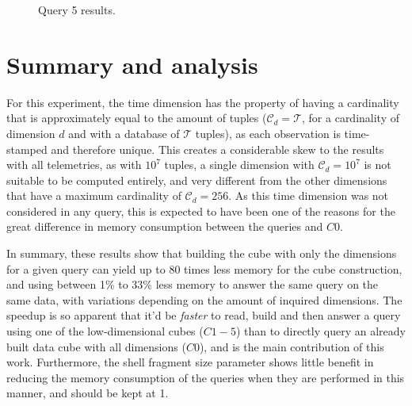 \begin{figure}[H]
  \caption{Query 5 results.}\label{fig:query5}
  \vspace{6mm}
  \begin{center}
  \end{center}
  \vspace{2mm}
\end{figure}

\section{Summary and analysis}\label{ch:querypart:summary}

For this experiment, the time dimension has the property of having a cardinality that is approximately equal to the amount of tuples (\(\mathcal{C}_d = \mathcal{T}\), for a cardinality of dimension \(d\) and with a database of \(\mathcal{T}\) tuples), as each observation is time-stamped and therefore unique.
This creates a considerable skew to the results with all telemetries, as with \(\ensuremath{10^{7}}\) tuples, a single dimension with \(\mathcal{C}_d = {10}^7\) is not suitable to be computed entirely, and very different from the other dimensions that have a maximum cardinality of \(\mathcal{C}_d = 256\).
As this time dimension was not considered in any query, this is expected to have been one of the reasons for the great difference in memory consumption between the queries and $C0$.

In summary, these results show that building the cube with only the dimensions for a given query can yield up to 80 times less memory for the cube construction, and using between 1\% to 33\% less memory to answer the same query on the same data, with variations depending on the amount of inquired dimensions.
The speedup is so apparent that it'd be \emph{faster} to read, build and then answer a query using one of the low-dimensional cubes (\(C1-5\)) than to directly query an already built data cube with all dimensions (\(C0\)), and is the main contribution of this work.
Furthermore, the shell fragment size parameter shows little benefit in reducing the memory consumption of the queries when they are performed in this manner, and should be kept at 1.

